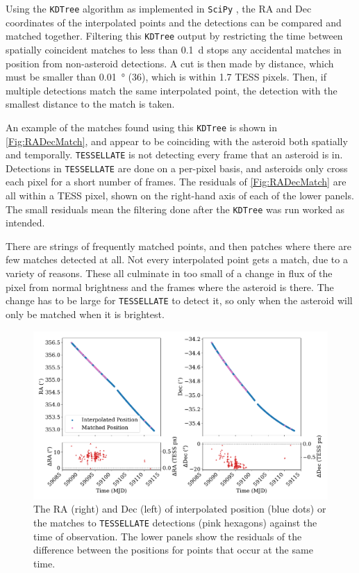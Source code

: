 \documentclass{UCreport}
\begin{document}
Using the \texttt{KDTree} algorithm \citep{Maneewongvatana1999} as implemented in \texttt{SciPy} \citep{2020SciPy-NMeth}, the RA and Dec coordinates of the interpolated points and the detections can be compared and matched together.
Filtering this \texttt{KDTree} output by restricting the time between spatially coincident matches to less than \qty{0.1}{\day} stops any accidental matches in position from non-asteroid detections.
A cut is then made by distance, which must be smaller than \qty{0.01}{\degree} (\qty{36}{\arcsec}), which is within 1.7 TESS pixels.
Then, if multiple detections match the same interpolated point, the detection with the smallest distance to the match is taken.

An example of the matches found using this \texttt{KDTree} is shown in \autoref{Fig:RADecMatch}, and appear to be coinciding with the asteroid both spatially and temporally.
\texttt{TESSELLATE} is not detecting every frame that an asteroid is in.
Detections in \texttt{TESSELLATE} are done on a per-pixel basis, and asteroids only cross each pixel for a short number of frames.
The residuals of \autoref{Fig:RADecMatch} are all within a TESS pixel, shown on the right-hand axis of each of the lower panels.
The small residuals mean the filtering done after the \texttt{KDTree} was run worked as intended.

There are strings of frequently matched points, and then patches where there are few matches detected at all.
Not every interpolated point gets a match, due to a variety of reasons.
These all culminate in too small of a change in flux of the pixel from normal brightness and the frames where the asteroid is there.
The change has to be large for \texttt{TESSELLATE} to detect it, so only when the asteroid will only be matched when it is brightest.


\begin{figure}[]
  \centering
  \includegraphics[width =\textwidth]{./Figures/DetectMatchPosUlysses.pdf}
  \caption[Interpolated and \texttt{TESSELLATE} Detected Positions Comparison]{The RA (right) and Dec (left) of interpolated position (blue dots) or the matches to \texttt{TESSELLATE} detections (pink hexagons) against the time of observation. The lower panels show the residuals of the difference between the positions for points that occur at the same time.}
  \label{Fig:RADecMatch}
\end{figure}
\end{document}
